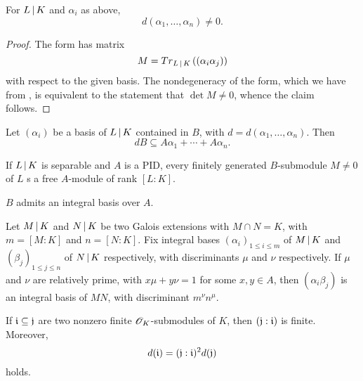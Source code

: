 \begin{corollary} For $L \mathop{|} K$ and $\alpha_i$ as above,
  \[d(\alpha_1,\ldots,\alpha_n) \neq 0.\]
\end{corollary}

\begin{proof}
  The form has matrix
  \[ M = {{\mathnormal{Tr}}_{L \mathop{|} K}}\left((\alpha_i\alpha_j)\right) \] with respect to the given basis. The
  nondegeneracy of the form, which we have from , is
  equivalent to the statement that $\det M \ne 0$, whence the claim follows.
\end{proof}

\begin{lemma}
  Let $(\alpha_i)$ be a basis of $L \mathop{|} K$ contained in $B$, with $d
  = d(\alpha_1,\ldots,\alpha_n)$. Then
  \[ dB \subseteq A\alpha_1 + \cdots + A\alpha_n. \]
\end{lemma}

\begin{prop}
  If $L \mathop{|} K$ is separable and $A$ is a PID, every finitely
  generated $B$-submodule $M\ne 0$ of $L$ s a free $A$-module of rank $[L:K]$.
\end{prop}
\begin{corollary}
  $B$ admits an integral basis over $A$.
\end{corollary}

\begin{prop}
  Let $M \mathop{|} K$ and $N \mathop{|} K$ be two Galois extensions
  with $M \cap N = K$, with $m = [M:K]$ and $n = [N:K]$. Fix integral bases
  $(\alpha_i)_{1 \le i \le m}$ of $M \mathop{|} K$ and $(\beta_j)_{1 \le j
    \le n}$ of $N \mathop{|} K$ respectively, with discriminants $\mu$ and
  $\nu$ respectively. If $\mu$ and $\nu$ are relatively prime, with $x\mu+y\nu =
  1$ for some $x,y\in A$, then $(\alpha_i\beta_j)$ is an integral basis of $MN$,
  with discriminant $m^\nu n^\mu$.
\end{prop}


\begin{prop}
  If $\mathfrak{i} \subseteq \mathfrak{j}$ are two nonzero finite $\mathscr{O}_K$-submodules of $K$, then
  $(\mathfrak{j}:\mathfrak{i})$ is finite. Moreover,
  \[ d(\mathfrak{i}) = (\mathfrak{j}:\mathfrak{i})^2d(\mathfrak{j}) \] holds.
\end{prop}
